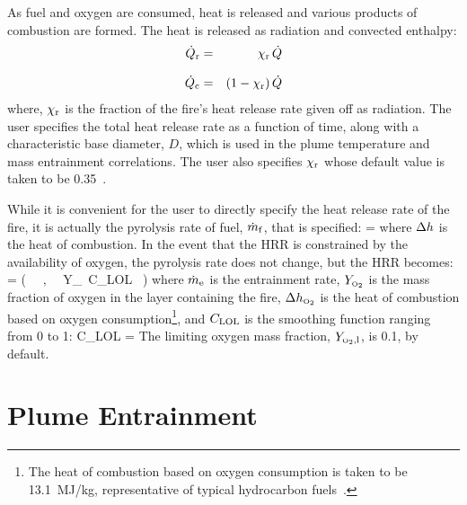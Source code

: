 As fuel and oxygen are consumed, heat is released and various products of combustion are formed. The heat is released as radiation and convected enthalpy:
\begin{eqnarray}
   \dot{Q}_{\rm r} &=& \chi_{\rm r} \, \dot{Q} \\[.1in]
   \dot{Q}_{\rm c} &=& (1-\chi_{\rm r}) \, \dot{Q}
\end{eqnarray}
where, $\chi_{\rm r}$ is the fraction  of the fire's heat release rate given off as radiation. The user specifies the total heat release rate as a function of time, along with a characteristic base diameter, $D$, which is used in the plume temperature and mass entrainment correlations. The user also specifies $\chi_{\rm r}$ whose default value is taken to be 0.35~\cite{Drysdale:1985}.

While it is convenient for the user to directly specify the heat release rate of the fire, it is actually the pyrolysis rate of fuel, $\dot{m}_{\rm f}$, that is specified:
\be
   \dmf = \frac{\dQ}{\Dh}
\ee
where $\Delta h$ is the heat of combustion. In the event that the HRR is constrained by the availability of oxygen, the pyrolysis rate does not change, but the HRR becomes:
\be
   \dQ = \min \Big( \dmf \, \Dh \, , \, \dme \, Y_\OTWO \, C_{\rm LOL} \, \DhO \Big)
\ee
where $\dot{m}_{\rm e}$ is the entrainment rate, $Y_{\tiny \hbox{O}_2}$ is the mass fraction of oxygen in the layer containing the fire, $\Delta h_{\tiny \hbox{O}_2}$ is the heat of combustion based on oxygen consumption\footnote{The heat of combustion based on oxygen consumption is taken to be 13.1~MJ/kg, representative of typical hydrocarbon fuels~\cite{Huggett:1980}.}, and $C_{\rm LOL}$ is the smoothing function ranging from 0 to 1:
\be
   C_{\rm LOL} = 
\ee
The limiting oxygen mass fraction, $Y_{{\tiny \hbox{O}_2},{\rm l}}$, is 0.1, by default.



\section{Plume Entrainment}


